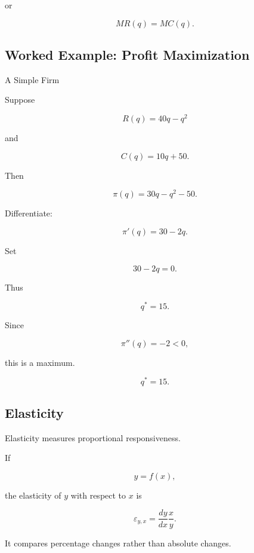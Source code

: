 or

\[
\boxed{
MR(q)=MC(q).
}
\]

\subsection{Worked Example: Profit Maximization}
\label{subsec:worked-profit-maximization}

\begin{workedexamplebox}{A Simple Firm}

Suppose

\[
R(q)=40q-q^2
\]

and

\[
C(q)=10q+50.
\]

Then

\[
\pi(q)
=
30q-q^2-50.
\]

Differentiate:

\[
\pi'(q)
=
30-2q.
\]

Set

\[
30-2q=0.
\]

Thus

\[
q^*=15.
\]

Since

\[
\pi''(q)=-2<0,
\]

this is a maximum.

\begin{answerbox}
\[
\boxed{
q^*=15.
}
\]
\end{answerbox}

\end{workedexamplebox}

\subsection{Elasticity}
\label{subsec:economic-elasticity}

Elasticity measures proportional responsiveness.

If

\[
y=f(x),
\]

the elasticity of \(y\) with respect to \(x\) is

\[
\boxed{
\varepsilon_{y,x}
=
\frac{dy}{dx}
\frac{x}{y}.
}
\]

It compares percentage changes rather than absolute changes.

